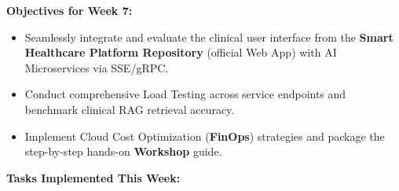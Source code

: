 \vspace{0.5em}\noindent\textbf{Objectives for Week 7:}

\begin{itemize}
\tightlist
\item
  Seamlessly integrate and evaluate the clinical user interface from the
  \textbf{Smart Healthcare Platform Repository} (official Web App) with
  AI Microservices via SSE/gRPC.
\item
  Conduct comprehensive Load Testing across service endpoints and
  benchmark clinical RAG retrieval accuracy.
\item
  Implement Cloud Cost Optimization (\textbf{FinOps}) strategies and
  package the step-by-step hands-on \textbf{Workshop} guide.
\end{itemize}

\vspace{0.5em}\noindent\textbf{Tasks Implemented This Week:}

